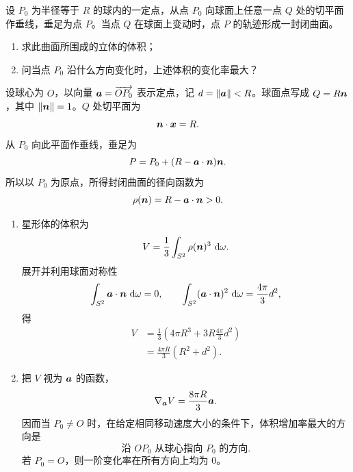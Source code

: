 \begin{xreferenceproblem}[4]
设 $P_0$ 为半径等于 $R$ 的球内的一定点，从点 $P_0$ 向球面上任意一点 $Q$ 处的切平面作垂线，垂足为点 $P$。当点 $Q$ 在球面上变动时，点 $P$ 的轨迹形成一封闭曲面。
  \begin{enumerate}[label=(\arabic*)]
    \item 求此曲面所围成的立体的体积；
    \item 问当点 $P_0$ 沿什么方向变化时，上述体积的变化率最大？
  \end{enumerate}
\end{xreferenceproblem}
\begin{xsolution}
设球心为 $O$，以向量 $\bm{a}=\overrightarrow{OP_0}$ 表示定点，记 $d=\lVert\bm{a}\rVert<R$。球面点写成 $Q=R\bm{n}$，其中 $\lVert\bm{n}\rVert=1$。$Q$ 处切平面为
\[
  \bm{n}\cdot\bm{x}=R.
\]
从 $P_0$ 向此平面作垂线，垂足为
\[
  P=P_0+(R-\bm{a}\cdot\bm{n})\bm{n}.
\]
所以以 $P_0$ 为原点，所得封闭曲面的径向函数为
\[
  \rho(\bm{n})=R-\bm{a}\cdot\bm{n}>0.
\]

\begin{enumerate}[label=(\arabic*)]
  \item 星形体的体积为
  \[
    V=\frac13\int_{S^2}\rho(\bm{n})^3\,\mathop{}\!\mathrm{d}\omega.
  \]
  展开并利用球面对称性
  \[
    \int_{S^2}\bm{a}\cdot\bm{n}\,\mathop{}\!\mathrm{d}\omega=0,
    \qquad
    \int_{S^2}(\bm{a}\cdot\bm{n})^2\,\mathop{}\!\mathrm{d}\omega
    =\frac{4\pi}{3}d^2,
  \]
  得
  \begin{align*}
    V&=\frac13\left(4\pi R^3+3R\frac{4\pi}{3}d^2\right)\\
     &=\boxed{\frac{4\pi R}{3}(R^2+d^2)}.
  \end{align*}

  \item 把 $V$ 视为 $\bm{a}$ 的函数，
  \[
    \nabla_{\bm{a}}V=\frac{8\pi R}{3}\bm{a}.
  \]
  因而当 $P_0\ne O$ 时，在给定相同移动速度大小的条件下，体积增加率最大的方向是
  \[
    \boxed{\text{沿 }OP_0\text{ 从球心指向 }P_0\text{ 的方向}}.
  \]
  若 $P_0=O$，则一阶变化率在所有方向上均为 $0$。
\end{enumerate}
\end{xsolution}


